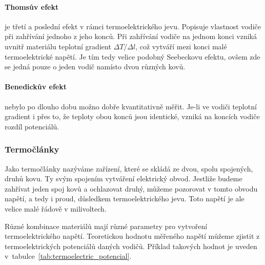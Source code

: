 \paragraph{Thomsův efekt} je třetí a poslední efekt v rámci termoelektrického
jevu.  Popisuje vlastnost vodiče při zahřívání jednoho z jeho konců. Při
zahřívání vodiče na jednom konci vzniká uvnitř materiálu teplotní gradient
$\Delta T/\Delta l$, což vytváří mezi konci malé termoelektrické napětí. Je tím
tedy velice podobný Seebeckovu efektu, ovšem zde se jedná pouze o jeden vodič
namísto dvou různých kovů.~\cite{jreichl-thomson}

\paragraph{Benedickův efekt} nebylo po dlouho dobu možno dobře kvantitativně
měřit.  Je-li ve vodiči teplotní gradient i přes to, že teploty obou konců jsou
identické, vzniká na koncích vodiče rozdíl potenciálů.~\cite{diplomka}

\subsubsection{Termočlánky}
Jako termočlánky nazýváme zařízení, které se skládá ze dvou, spolu spojených,
druhů kovu. Ty svým spojením vytváření elektrický obvod. Jestliže budeme
zahřívat jeden spoj kovů a ochlazovat druhý, můžeme pozorovat v tomto obvodu
napětí, a tedy i proud, důsledkem termoelektrického jevu. Toto napětí je ale
velice malé řádově v milivoltech.

Různé kombinace materiálů mají různé parametry pro vytvoření termoelektrického 
napětí. Teoretickou hodnotu měřeného napětí můžeme zjistit z termoelektrických
potenciálů daných vodičů. Příklad takových hodnot je uveden 
v~tabulce~\ref{tab:termoelectric_potencial}.

